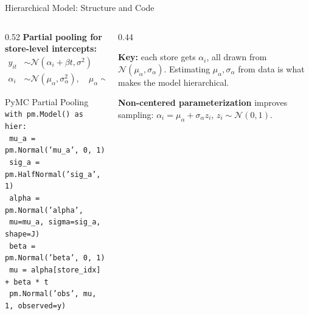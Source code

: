 \documentclass[aspectratio=169, 11pt]{beamer}
\begin{document}
\begin{frame}{Hierarchical Model: Structure and Code}
  \begin{columns}[T]
    \begin{column}{0.52\textwidth}
      \small\textbf{Partial pooling for store-level intercepts:}
      \vspace{-0.2cm}
      {\small
      \begin{align*}
        y_{it} &\sim \mathcal{N}(\alpha_i + \beta t, \sigma^2) \\
        \alpha_i &\sim \mathcal{N}(\mu_\alpha, \sigma_\alpha^2), \quad
        \mu_\alpha \sim \mathcal{N}(\bar{y}, \text{SD}(y)), \quad
        \sigma_\alpha \sim \text{HN}(1)
      \end{align*}
      }
      \vspace{-0.2cm}
      \begin{examplebox}{PyMC Partial Pooling}
        {\footnotesize
        \texttt{with pm.Model() as hier:}\\
        \texttt{  mu\_a  = pm.Normal('mu\_a', 0, 1)}\\
        \texttt{  sig\_a = pm.HalfNormal('sig\_a', 1)}\\
        \texttt{  alpha = pm.Normal('alpha',}\\
        \texttt{    mu=mu\_a, sigma=sig\_a, shape=J)}\\
        \texttt{  beta = pm.Normal('beta', 0, 1)}\\
        \texttt{  mu = alpha[store\_idx] + beta * t}\\
        \texttt{  pm.Normal('obs', mu, 1, observed=y)}
        }
      \end{examplebox}
    \end{column}
    \begin{column}{0.44\textwidth}
      \begin{keybox}
        \small\textbf{Key:} each store gets $\alpha_i$, all drawn from
        $\mathcal{N}(\mu_\alpha, \sigma_\alpha)$.
        Estimating $\mu_\alpha, \sigma_\alpha$ from data
        is what makes the model hierarchical.
      \end{keybox}
      \vspace{0.1cm}
      \begin{warningbox}
        \small \textbf{Non-centered parameterization}
        improves sampling:
        $\alpha_i = \mu_\alpha + \sigma_\alpha z_i$,
        $z_i \sim \mathcal{N}(0,1)$.
      \end{warningbox}
    \end{column}
  \end{columns}
\end{frame}
\end{document}
